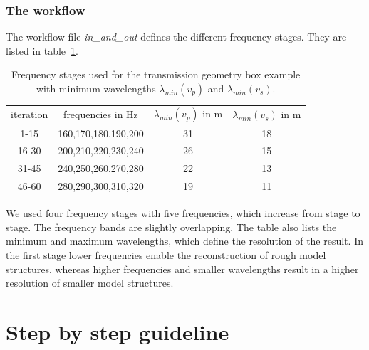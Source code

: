 \subsubsection*{The workflow}
The workflow file \textit{in\_and\_out} defines the different frequency stages. They are listed in table~\ref{tab:toy_fstage}.\\
\begin{table}[h!]
\centering 
\begin{tabular}{|c|c|c|c|}\hline
 iteration& frequencies in Hz & $\lambda_{min}(v_p)$ in m &$\lambda_{min}(v_s)$ in m \\
 1-15& 160,170,180,190,200 & 31 & 18\\
16-30& 200,210,220,230,240 & 26 & 15\\
31-45& 240,250,260,270,280 & 22 & 13\\
46-60& 280,290,300,310,320 & 19 & 11\\
\hline
\end{tabular}
\caption[Transmission example: frequency stages]{Frequency stages used for the transmission geometry box example with minimum wavelengths $\lambda_{min}(v_p)$ and $\lambda_{min}(v_s)$.}
\label{tab:toy_fstage}
\end{table}
We used four frequency stages with five frequencies, which increase from stage to stage. The frequency bands are slightly overlapping. The table also lists the minimum and maximum wavelengths, which define the resolution of the result. In the first stage lower frequencies enable the reconstruction of rough model structures, whereas higher frequencies and smaller wavelengths result in a higher resolution of smaller model structures.
\section{Step by step guideline}
